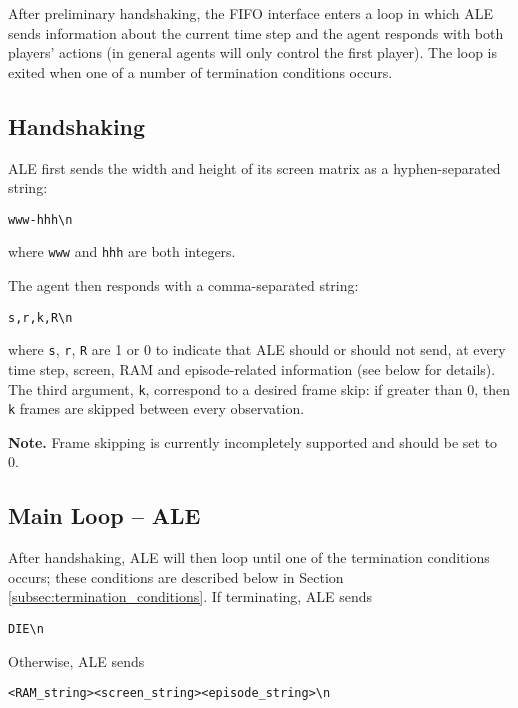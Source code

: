 \documentclass[12pt]{article}
\begin{document}
After preliminary handshaking, the FIFO interface enters a loop in which ALE sends information about the current time step and the agent responds with both players' actions (in general agents will only control the first player). The loop is exited when one of a number of termination conditions occurs.

\subsection{Handshaking}

ALE first sends the width and height of its screen matrix as a hyphen-separated string:

\begin{verbatim}
www-hhh\n
\end{verbatim}

where \verb+www+ and \verb+hhh+ are both integers.

The agent then responds with a comma-separated string:

\begin{verbatim}
s,r,k,R\n
\end{verbatim}

where \verb+s+, \verb+r+, \verb+R+ are 1 or 0 to indicate that ALE should or should not send, at every time step, screen, RAM and episode-related information (see below for details). The third argument, \verb+k+, correspond to a desired frame skip: if greater than 0, then \verb+k+ frames are skipped between every observation.

\textbf{Note.} Frame skipping is currently incompletely supported and should be set to 0.

\subsection{Main Loop -- ALE}

After handshaking, ALE will then loop until one of the termination conditions occurs; these conditions are described below in Section \ref{subsec:termination_conditions}. If terminating, ALE sends

\begin{verbatim}
DIE\n
\end{verbatim}

Otherwise, ALE sends

\begin{verbatim}
<RAM_string><screen_string><episode_string>\n
\end{verbatim}
\end{document}

